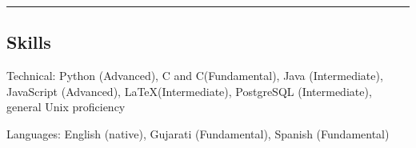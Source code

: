 \documentclass[10pt,letterpaper]{article}
\newenvironment{indentsection}[1]%
{\begin{list}{}%
	{\setlength{\leftmargin}{#1}}%
	\item[]%
}
{\end{list}}
\newcommand{\CPP}
{C\nolinebreak[4]\hspace{-.05em}\raisebox{.22ex}{\footnotesize\bf ++}}
\begin{document}
\hrule
\vspace{-0.4em}
\subsection*{Skills}

\begin{indentsection}{\parindent}
\begin{description*}
	\item[Technical:]
	Python (Advanced), C and \CPP (Fundamental), Java (Intermediate), JavaScript (Advanced), \LaTeX (Intermediate), PostgreSQL (Intermediate), general Unix proficiency
	\item[Languages:]
	English (native), Gujarati (Fundamental), Spanish (Fundamental)
\end{description*}
\end{indentsection}
\end{document}
